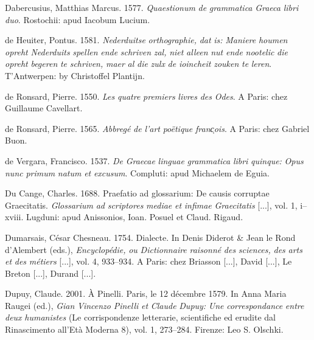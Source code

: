 Dabercusius, Matthias Marcus. 1577. \textit{Quaestionum} \textit{de} \textit{grammatica} \textit{Graeca} \textit{libri} \textit{duo}. Rostochii: apud Iacobum Lucium.

de Heuiter, Pontus. 1581. \textit{Nederduitse} \textit{orthographie,} \textit{dat} \textit{is:} \textit{Maniere} \textit{houmen} \textit{opreht} \textit{Nederduits} \textit{spellen} \textit{ende} \textit{schriven} \textit{zal,} \textit{niet} \textit{alleen} \textit{nut} \textit{ende} \textit{nootelic} \textit{die} \textit{opreht} \textit{begeren} \textit{te} \textit{schriven,} \textit{maer} \textit{al} \textit{die} \textit{zulx} \textit{de} \textit{ioincheit} \textit{zouken} \textit{te} \textit{leren}. T’Antwerpen: by Christoffel Plantijn.

de Ronsard, Pierre. 1550. \textit{Les} \textit{quatre} \textit{premiers} \textit{livres} \textit{des} \textit{Odes}. A Paris: chez Guillaume Cavellart.

de Ronsard, Pierre. 1565. \textit{Abbregé} \textit{de} \textit{l’art} \textit{poëtique} \textit{franc̜ois}. A Paris: chez Gabriel Buon.

de Vergara, Francisco. 1537. \textit{De} \textit{Graecae} \textit{linguae} \textit{grammatica} \textit{libri} \textit{quinque:} \textit{Opus} \textit{nunc} \textit{primum} \textit{natum} \textit{et} \textit{excusum}. Compluti: apud Michaelem de Eguia.

Du Cange, Charles. 1688. Praefatio ad glossarium: De causis corruptae Graecitatis. \textit{Glossarium} \textit{ad} \textit{scriptores} \textit{mediae} \textit{et} \textit{infimae} \textit{Graecitatis} [...], vol. 1, i–xviii. Lugduni: apud Anissonios, Ioan. Posuel et Claud. Rigaud.

Dumarsais, César Chesneau. 1754. Dialecte. In Denis Diderot \& Jean le Rond d’Alembert (eds.), \textit{Encyclopédie,} \textit{ou} \textit{Dictionnaire} \textit{raisonné} \textit{des} \textit{sciences,} \textit{des} \textit{arts} \textit{et} \textit{des} \textit{métiers} [...], vol. 4, 933–934. A Paris: chez Briasson [...], David [...], Le Breton [...], Durand [...].

Dupuy, Claude. 2001. À Pinelli. Paris, le 12 décembre 1579. In Anna Maria Raugei (ed.), \textit{Gian} \textit{Vincenzo} \textit{Pinelli} \textit{et} \textit{Claude} \textit{Dupuy:} \textit{Une} \textit{correspondance} \textit{entre} \textit{deux} \textit{humanistes} (Le corrispondenze letterarie, scientifiche ed erudite dal Rinascimento all’Età Moderna 8), vol. 1, 273–284. Firenze: Leo S. Olschki.

